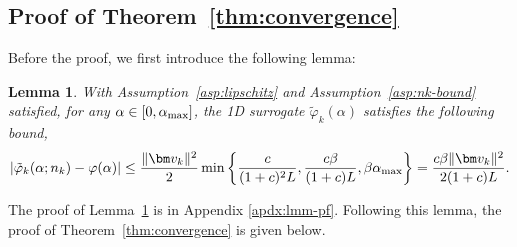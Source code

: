 \documentclass[10pt]{article} %
\numberwithin{equation}{section}
\theoremstyle{plain}
\newtheorem{lemma}[theorem]{Lemma}
\theoremstyle{definition}
\newcommand{\<}{\langle}
\renewcommand{\>}{\rangle}
\renewcommand{\(}{\left(}
\renewcommand{\)}{\right)}
\renewcommand{\[}{\left[}
\renewcommand{\]}{\right]}
\newcommand{\alphaMax}{\alpha_\textup{max}}
\newcommand{\Lip}{L}
\newcommand{\HFSurrogate}{\tilde{\varphi}_k}
\begin{document}
\subsection{Proof of Theorem~\ref{thm:convergence}}
\label{ssec:proof}

\noindent Before the proof, we first introduce the following lemma:
\begin{lemma}
\label{lm:surrogate-bound}
    With Assumption~\ref{asp:lipschitz} and Assumption~\ref{asp:nk-bound} satisfied, for any $\alpha\in[0, \alphaMax]$, the 1D surrogate $\HFSurrogate(\alpha)$ satisfies the following bound,
    \begin{equation}
    \label{eq:surrogate-bound}
    \begin{aligned}
        \lvert \HFSurrogate(\alpha; n_k) - \varphi(\alpha)\rvert \leq \frac{\lVert \bm v_k\rVert^2}{2} \min\left\{\frac{c}{(1+c)^2\Lip}, \frac{c\beta}{(1+c)\Lip}, \beta \alphaMax\right\}=\frac{c\beta\lVert\bm v_k\rVert^2}{2(1+c)\Lip}.
    \end{aligned}
    \end{equation}
\end{lemma}
The proof of Lemma~\ref{lm:surrogate-bound} is in Appendix \ref{apdx:lmm-pf}. Following this lemma, the proof of Theorem~\ref{thm:convergence} is given below.
\end{document}
